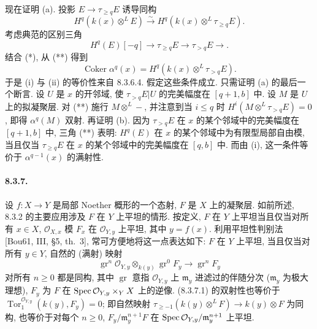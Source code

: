 现在证明 (a). 投影 $E\to\tau_{\geq q}E$ 诱导同构
\begin{equation}H^q(k(x)\otimes^LE)\xrightarrow\sim H^q(k(x)\otimes^L\tau_{\geq q}E).\tag{*}\label{ch08:eq8365star}\end{equation}
考虑典范的区别三角
\begin{equation}H^q(E)[-q]\longrightarrow\tau_{\geq q}E\longrightarrow\tau_{>q}E\longrightarrow.\tag{**}\label{ch08:eq8365star2}\end{equation}
结合 (*), 从 (**) 得到
\begin{equation}\operatorname{Coker}\alpha^q(x)=H^q(k(x)\otimes^L\tau_{>q}E).\tag{***}\label{ch08:eq8365star3}\end{equation}
于是 (i) 与 (ii) 的等价性来自 8.3.6.4. 假定这些条件成立. 只需证明 (a) 的最后一个断言. 设 $U$ 是 $x$ 的开邻域, 使 $\tau_{>q}E|U$ 的完美幅度在 $[q+1,b]$ 中. 设 $M$ 是 $U$ 上的拟凝聚层. 对 (**) 施行 $M\otimes^L-$, 并注意到当 $i\leq q$ 时 $H^i(M\otimes^L\tau_{>q}E)=0$, 即得 $\alpha^q(M)$ 双射. 再证明 (b). 因为 $\tau_{>q}E$ 在 $x$ 的某个邻域中的完美幅度在 $[q+1,b]$ 中, 三角 (**) 表明: $H^q(E)$ 在 $x$ 的某个邻域中为有限型局部自由模,
当且仅当 $\tau_{\geq q}E$ 在 $x$ 的某个邻域中的完美幅度在 $[q,b]$ 中. 而由 (i), 这一条件等价于 $\alpha^{q-1}(x)$ 的满射性.

\paragraph{8.3.7.}
设 $f:X\to Y$ 是局部 Noether 概形的一个态射, $F$ 是 $X$ 上的凝聚层. 如前所述, 8.3.2 的主要应用涉及 $F$ 在 $Y$ 上平坦的情形. 按定义, $F$ 在 $Y$ 上平坦当且仅当对所有 $x\in X$, $\mathcal O_{X,x}$ 模 $F_x$ 在 $\mathcal O_{Y,y}$ 上平坦, 其中 $y=f(x)$. 利用平坦性判别法 [Bou61, III, §5, th.~3], 常可方便地将这一点表达如下: $F$ 在 $Y$ 上平坦, 当且仅当对所有 $y\in Y$, 自然的 (满射) 映射
\begin{equation}\operatorname{gr}^n\mathcal O_{Y,y}\otimes_{k(y)}\operatorname{gr}^0F_y\longrightarrow\operatorname{gr}^nF_y\tag{8.3.7.1}\label{ch08:eq8371}\end{equation}
对所有 $n\geq0$ 都是同构, 其中 $\operatorname{gr}$ 意指 $\mathcal O_{Y,y}$ 上 $\mathfrak m_y$ 进滤过的伴随分次 ($\mathfrak m_y$ 为极大理想), $F_y$ 为 $F$ 在 $\operatorname{Spec}\mathcal O_{Y,y}\times_YX$ 上的逆像. (8.3.7.1) 的双射性也等价于 $\operatorname{Tor}_1^{\mathcal O_{Y,y}}(k(y),F_y)=0$; 即自然映射 $\tau_{\geq-1}(k(y)\otimes^LF)\to k(y)\otimes F$ 为同构, 也等价于对每个 $n\geq0$, $F_y/\mathfrak m_y^{n+1}F$ 在 $\operatorname{Spec}\mathcal O_{Y,y}/\mathfrak m_y^{n+1}$ 上平坦.

